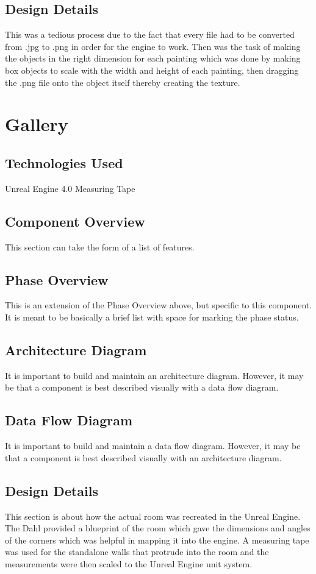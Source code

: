 \subsection{Design Details}
This was a tedious process due to the fact that every file had to be converted from .jpg to .png in order for the engine to work.  Then was the task of making the objects in the right dimension for each painting which was done by making box objects to scale with the width and height of each painting, then dragging the .png file onto the object itself thereby creating the texture.


\section{Gallery }

\subsection{Technologies  Used}
Unreal Engine 4.0
Measuring Tape

\subsection{Component  Overview}
This section can take the form of a list of features. 

\subsection{Phase Overview}
This is an extension of the Phase Overview above, but specific to this component. 
 It is meant to be basically a brief list with space for marking the phase status. 

\subsection{ Architecture  Diagram}
It is important to build and maintain an architecture diagram.  However, it may 
be that a component is best described visually with a data flow diagram. 


\subsection{Data Flow Diagram}
It is important to build and maintain a data flow diagram.  However, it may be 
that a component is best described visually with an architecture diagram. 


\subsection{Design Details}
This section is about how the actual room was recreated in the Unreal Engine.  The Dahl provided a blueprint of the room which gave the dimensions and angles of the corners which was helpful in mapping it into the engine.  A measuring tape was used for the standalone walls that protrude into the room and the measurements were then scaled to the Unreal Engine unit system.

